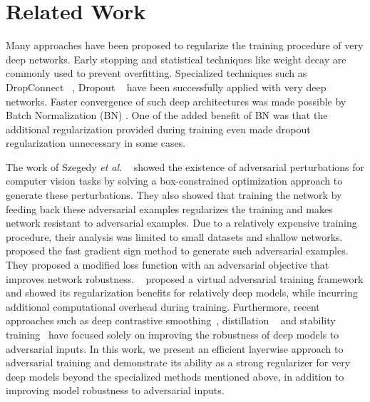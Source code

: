 \documentclass[letterpaper]{article} %
\begin{document}
\section{Related Work}

Many approaches have been proposed to regularize the training procedure of very deep networks. Early stopping and statistical techniques like weight decay are commonly used to prevent overfitting. Specialized techniques such as DropConnect ~\cite{icml2013_wan13}, Dropout ~\cite{srivastava2014dropout} have been successfully applied with very deep networks. Faster convergence of such deep architectures was made possible by Batch Normalization (BN) \cite{ioffe2015batch}. One of the added benefit of BN was that the additional regularization provided during training even made dropout regularization unnecessary in some cases.

The work of Szegedy \emph{et al.} ~\cite{szegedy2013intriguing} showed the existence of adversarial perturbations for computer vision tasks by solving a box-constrained optimization approach to generate these perturbations. They also showed that training the network by feeding back these adversarial examples regularizes the training and makes network resistant to adversarial examples. Due to a relatively expensive training procedure, their analysis was limited to small datasets and shallow networks.~\cite{goodfellow2014explaining} proposed the fast gradient sign method to generate such adversarial examples. They proposed a modified loss function with an adversarial objective that improves network robustness. ~\cite{miyato2017virtual} proposed a virtual adversarial training framework and showed its regularization benefits for relatively deep models, while incurring additional computational overhead during training. Furthermore, recent approaches such as deep contrastive smoothing~\cite{gu2014towards}, distillation  ~\cite{papernot2016distillation} and stability training~\cite{zheng2016improving} have focused solely on improving the robustness of deep models to adversarial inputs. In this work, we present an efficient layerwise approach to adversarial training and demonstrate its ability as a strong regularizer for very deep models beyond the specialized methods mentioned above, in addition to improving model robustness to adversarial inputs.
\end{document}
